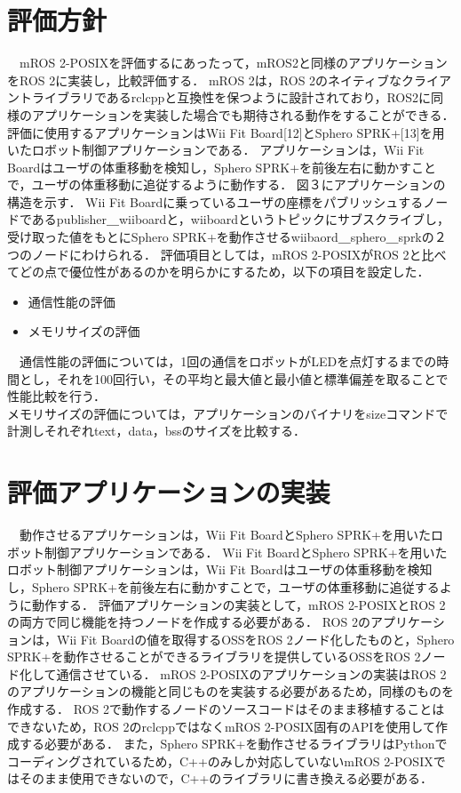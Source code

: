 \documentclass[11pt]{ujarticle}
\begin{document}
\section{評価方針}
　mROS 2-POSIXを評価するにあったって，mROS2と同様のアプリケーションをROS 2に実装し，比較評価する．
mROS 2は，ROS 2のネイティブなクライアントライブラリであるrclcppと互換性を保つように設計されており，ROS2に同様のアプリケーションを実装した場合でも期待される動作をすることができる．
評価に使用するアプリケーションはWii Fit Board[12]とSphero SPRK+[13]を用いたロボット制御アプリケーションである．
アプリケーションは，Wii Fit Boardはユーザの体重移動を検知し，Sphero SPRK+を前後左右に動かすことで，ユーザの体重移動に追従するように動作する．
図３にアプリケーションの構造を示す．
Wii Fit Boardに乗っているユーザの座標をパブリッシュするノードであるpublisher＿wiiboardと，wiiboardというトピックにサブスクライブし，受け取った値をもとにSphero SPRK+を動作させるwiibaord＿sphero＿sprkの２つのノードにわけられる．
評価項目としては，mROS 2-POSIXがROS 2と比べてどの点で優位性があるのかを明らかにするため，以下の項目を設定した．
\begin{itemize}
	\item 通信性能の評価
	\item メモリサイズの評価
\end{itemize}
　通信性能の評価については，1回の通信をロボットがLEDを点灯するまでの時間とし，それを100回行い，その平均と最大値と最小値と標準偏差を取ることで性能比較を行う．
\\メモリサイズの評価については，アプリケーションのバイナリをsizeコマンドで計測しそれぞれtext，data，bssのサイズを比較する．

\section{評価アプリケーションの実装}
　動作させるアプリケーションは，Wii Fit BoardとSphero SPRK+を用いたロボット制御アプリケーションである．
Wii Fit BoardとSphero SPRK+を用いたロボット制御アプリケーションは，Wii Fit Boardはユーザの体重移動を検知し，Sphero SPRK+を前後左右に動かすことで，ユーザの体重移動に追従するように動作する．
評価アプリケーションの実装として，mROS 2-POSIXとROS 2の両方で同じ機能を持つノードを作成する必要がある．
ROS 2のアプリケーションは，Wii Fit Boardの値を取得するOSSをROS 2ノード化したものと，Sphero SPRK+を動作させることができるライブラリを提供しているOSSをROS 2ノード化して通信させている．
mROS 2-POSIXのアプリケーションの実装はROS 2のアプリケーションの機能と同じものを実装する必要があるため，同様のものを作成する．
ROS 2で動作するノードのソースコードはそのまま移植することはできないため，ROS 2のrclcppではなくmROS 2-POSIX固有のAPIを使用して作成する必要がある．
また，Sphero SPRK+を動作させるライブラリはPythonでコーディングされているため，C++のみしか対応していないmROS 2-POSIXではそのまま使用できないので，C++のライブラリに書き換える必要がある．
\end{document}
